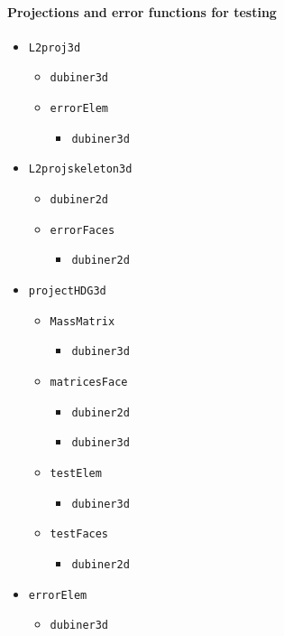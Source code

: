\documentclass[10pt,english]{article}
\begin{document}
\paragraph{Projections and error functions for testing}

\begin{itemize}
\item {\tt L2proj3d}
\begin{itemize}
\item {\tt dubiner3d}
\item {\tt errorElem}
\begin{itemize}
\item {\tt dubiner3d}
\end{itemize}
\end{itemize}
\item {\tt L2projskeleton3d}
\begin{itemize}
\item {\tt dubiner2d}
\item {\tt errorFaces}
\begin{itemize}
\item {\tt dubiner2d}
\end{itemize}
\end{itemize}
\item {\tt projectHDG3d}
\begin{itemize}
\item {\tt MassMatrix}
\begin{itemize}
\item {\tt dubiner3d}
\end{itemize}
\item {\tt matricesFace}
\begin{itemize}
\item {\tt dubiner2d}
\item {\tt dubiner3d}
\end{itemize}
\item {\tt testElem}
\begin{itemize}
\item {\tt dubiner3d}
\end{itemize}
\item {\tt testFaces}
\begin{itemize}
\item {\tt dubiner2d}
\end{itemize}
\end{itemize}
\item {\tt errorElem}
\begin{itemize}
\item {\tt dubiner3d}

\end{itemize}
\end{itemize}
\end{document}
